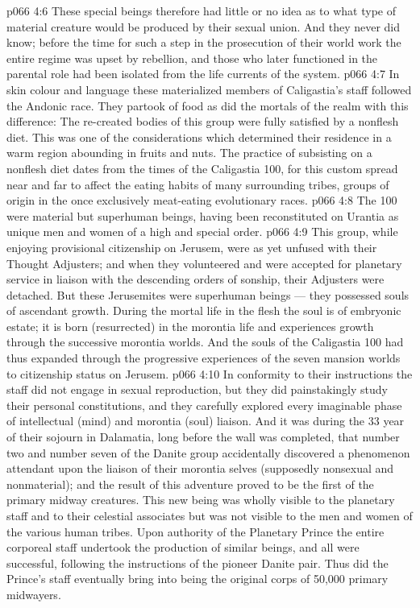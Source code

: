 \vs p066 4:6 These special beings therefore had little or no idea as to what type of material creature would be produced by their sexual union. And they never did know; before the time for such a step in the prosecution of their world work the entire regime was upset by rebellion, and those who later functioned in the parental role had been isolated from the life currents of the system.
\vs p066 4:7 In skin colour and language these materialized members of Caligastia’s staff followed the Andonic race. They partook of food as did the mortals of the realm with this difference: The re\hyp{}created bodies of this group were fully satisfied by a nonflesh diet. This was one of the considerations which determined their residence in a warm region abounding in fruits and nuts. The practice of subsisting on a nonflesh diet dates from the times of the Caligastia 100, for this custom spread near and far to affect the eating habits of many surrounding tribes, groups of origin in the once exclusively meat\hyp{}eating evolutionary races.
\vs p066 4:8 \bibnobreakspace The 100 were material but superhuman beings, having been reconstituted on Urantia as unique men and women of a high and special order.
\vs p066 4:9 This group, while enjoying provisional citizenship on Jerusem, were as yet unfused with their Thought Adjusters; and when they volunteered and were accepted for planetary service in liaison with the descending orders of sonship, their Adjusters were detached. But these Jerusemites were superhuman beings --- they possessed souls of ascendant growth. During the mortal life in the flesh the soul is of embryonic estate; it is born (resurrected) in the morontia life and experiences growth through the successive morontia worlds. And the souls of the Caligastia 100 had thus expanded through the progressive experiences of the seven mansion worlds to citizenship status on Jerusem.
\vs p066 4:10 In conformity to their instructions the staff did not engage in sexual reproduction, but they did painstakingly study their personal constitutions, and they carefully explored every imaginable phase of intellectual (mind) and morontia (soul) liaison. And it was during the 33 year of their sojourn in Dalamatia, long before the wall was completed, that number two and number seven of the Danite group accidentally discovered a phenomenon attendant upon the liaison of their morontia selves (supposedly nonsexual and nonmaterial); and the result of this adventure proved to be the first of the primary midway creatures. This new being was wholly visible to the planetary staff and to their celestial associates but was not visible to the men and women of the various human tribes. Upon authority of the Planetary Prince the entire corporeal staff undertook the production of similar beings, and all were successful, following the instructions of the pioneer Danite pair. Thus did the Prince’s staff eventually bring into being the original corps of 50,000 primary midwayers.
